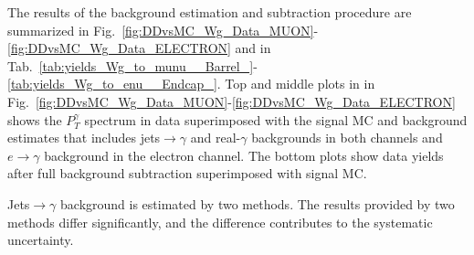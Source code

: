 The results of the background estimation and subtraction procedure are summarized in Fig.~\ref{fig:DDvsMC_Wg_Data_MUON}-\ref{fig:DDvsMC_Wg_Data_ELECTRON} and in Tab.~\ref{tab:yields_Wg_to_munu__Barrel_}-\ref{tab:yields_Wg_to_enu__Endcap_}. Top and middle plots in in Fig.~\ref{fig:DDvsMC_Wg_Data_MUON}-\ref{fig:DDvsMC_Wg_Data_ELECTRON} shows the $P_T^\gamma$ spectrum in data superimposed with the signal MC and background estimates that includes jets$\rightarrow\gamma$ and real-$\gamma$ backgrounds in both channels and $e\rightarrow\gamma$ background in the electron channel. The bottom plots show data yields after full background subtraction superimposed with signal MC. 

Jets$\rightarrow\gamma$ background is estimated by two methods. The results provided by two methods differ significantly, and the difference contributes to the systematic uncertainty.

